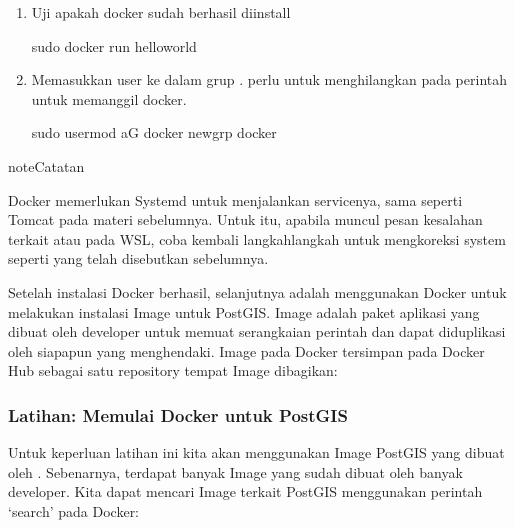 \documentclass[letterpaper,10pt,english]{sphinxmanual}
\begin{document}
\begin{enumerate}
\begin{sphinxVerbatim}[commandchars=\\\{\}]
sudo apt\PYGZhy{}get update
sudo apt\PYGZhy{}get install docker\PYGZhy{}ce docker\PYGZhy{}ce\PYGZhy{}cli containerd.io
\end{sphinxVerbatim}

\item {} 
Uji apakah docker sudah berhasil diinstall

\begin{sphinxVerbatim}[commandchars=\\\{\}]
sudo docker run hello\PYGZhy{}world
\end{sphinxVerbatim}

\item {} 
Memasukkan user ke dalam grup .  perlu untuk menghilangkan  pada perintah untuk memanggil docker.

\begin{sphinxVerbatim}[commandchars=\\\{\}]
sudo usermod \PYGZhy{}aG docker 
newgrp docker 
\end{sphinxVerbatim}

\end{enumerate}

\begin{sphinxadmonition}{note}{Catatan}

Docker memerlukan Systemd untuk menjalankan servicenya, sama seperti Tomcat pada materi sebelumnya. Untuk itu, apabila muncul pesan kesalahan terkait  atau  pada WSL, coba kembali langkah\sphinxhyphen{}langkah untuk mengkoreksi system seperti yang telah disebutkan sebelumnya.
\end{sphinxadmonition}

Setelah instalasi Docker berhasil, selanjutnya adalah menggunakan Docker untuk melakukan instalasi Image untuk PostGIS. Image adalah paket aplikasi yang dibuat oleh developer untuk memuat serangkaian perintah dan dapat diduplikasi oleh siapapun yang menghendaki. Image pada Docker tersimpan pada Docker Hub sebagai satu repository tempat Image dibagikan:



\subsubsection{Latihan: Memulai Docker untuk PostGIS}
\label{\detokenize{sesi2/relationaldb:latihan-memulai-docker-untuk-postgis}}
Untuk keperluan latihan ini kita akan menggunakan Image PostGIS yang dibuat oleh . Sebenarnya, terdapat banyak Image yang sudah dibuat oleh banyak developer. Kita dapat mencari Image terkait PostGIS menggunakan perintah ‘search’ pada Docker:
\end{document}
